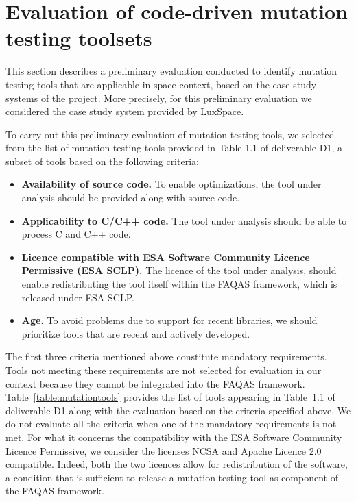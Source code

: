 \clearpage
\section{Evaluation of code-driven mutation testing toolsets}


This section describes a preliminary evaluation conducted to identify mutation testing tools that are applicable in space context, based on the case study systems of the project. More precisely, for this preliminary evaluation we considered the case study system provided by LuxSpace.

To carry out this preliminary evaluation of mutation testing tools, we selected from the list of mutation testing tools provided in Table 1.1 of deliverable D1, a subset of tools based on the following criteria:

\begin{itemize}
	\item \textbf{Availability of source code.} To enable optimizations, the tool under analysis should be provided along with source code.
	\item \textbf{Applicability to C/C++ code.} The tool under analysis should be able to process C and C++ code.
	\item \textbf{Licence compatible with ESA Software Community Licence Permissive (ESA SCLP).} The licence of the tool under analysis, should enable redistributing the tool itself within the FAQAS framework, which is released under ESA SCLP.
	\item \textbf{Age.} To avoid problems due to support for recent libraries, we should prioritize tools that are recent and actively developed.
\end{itemize}




The first three criteria mentioned above constitute mandatory requirements. 
Tools not meeting these requirements are not selected for evaluation in our context because they cannot be integrated into the FAQAS framework.
Table~\ref{table:mutationtools} provides the list of tools appearing in Table~1.1 of deliverable D1 along with the evaluation based on the criteria specified above. We do not evaluate all the criteria when one of the mandatory requirements is not met.
For what it concerns the compatibility with the ESA Software Community Licence Permissive, we consider the licenses NCSA and Apache Licence 2.0 compatible. 
Indeed, both the two licences allow for redistribution of the software, a condition that is sufficient to release a mutation testing tool as component of the FAQAS framework.


